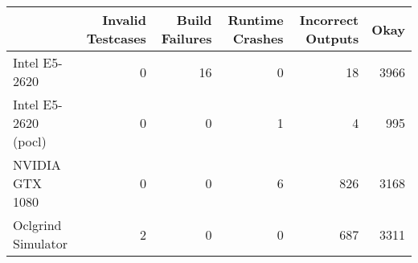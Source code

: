 \begin{tabular}{lrrrrr}
\toprule
{} &  Invalid Testcases &  Build Failures &  Runtime Crashes &  Incorrect Outputs &  Okay \\
\midrule
Intel E5-2620        &                  0 &              16 &                0 &                 18 &  3966 \\
Intel E5-2620 (pocl) &                  0 &               0 &                1 &                  4 &   995 \\
NVIDIA GTX 1080      &                  0 &               0 &                6 &                826 &  3168 \\
Oclgrind Simulator   &                  2 &               0 &                0 &                687 &  3311 \\
\bottomrule
\end{tabular}
